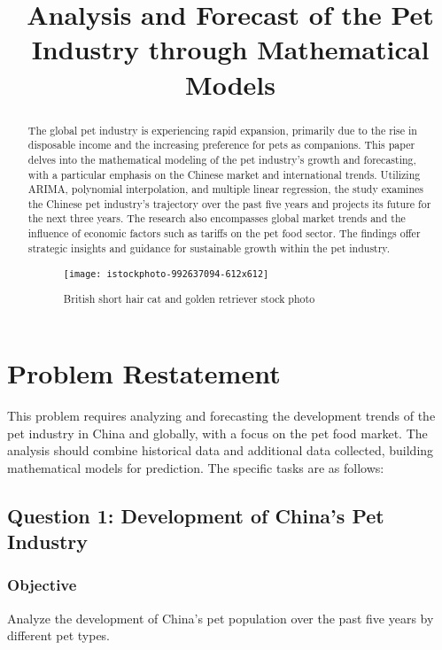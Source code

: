 \documentclass[withoutpreface,bwprint]{cumcmthesis} %
\title{Analysis and Forecast of the Pet Industry through Mathematical Models}
\begin{document}
 \maketitle
 \begin{abstract}
    The global pet industry is experiencing rapid expansion, primarily due to the rise in disposable income and the increasing preference for pets as companions. This paper delves into the mathematical modeling of the pet industry's growth and forecasting, with a particular emphasis on the Chinese market and international trends. Utilizing ARIMA, polynomial interpolation, and multiple linear regression, the study examines the Chinese pet industry's trajectory over the past five years and projects its future for the next three years. The research also encompasses global market trends and the influence of economic factors such as tariffs on the pet food sector. The findings offer strategic insights and guidance for sustainable growth within the pet industry.
\begin{figure}[htbp]
	\centering
	\texttt{[image: istockphoto-992637094-612x612]}
	\caption{British short hair cat and golden retriever stock photo\cite{1}}
\end{figure}

\end{abstract}

\tableofcontents

\section{Problem Restatement}

This problem requires analyzing and forecasting the development trends of the pet industry in China and globally, with a focus on the pet food market. The analysis should combine historical data and additional data collected, building mathematical models for prediction. The specific tasks are as follows:
\subsection{Question 1: Development of China's Pet Industry}

\subsubsection{Objective}
Analyze the development of China's pet population over the past five years by different pet types.
\end{document}
